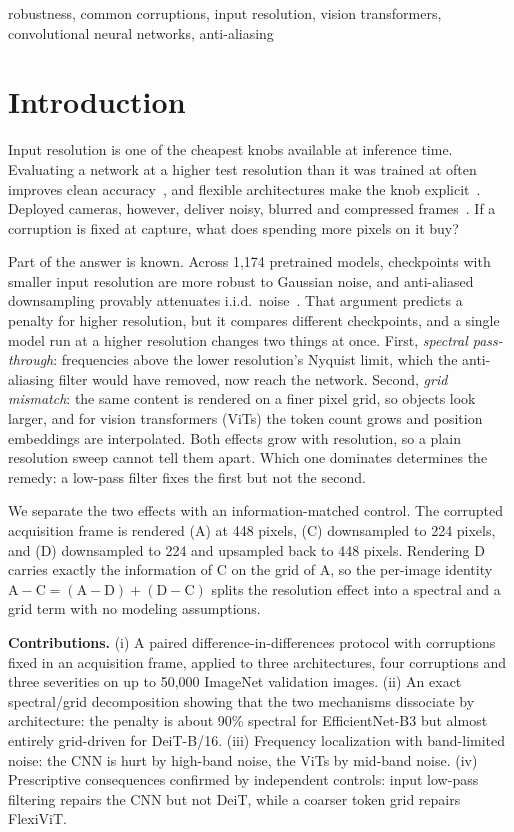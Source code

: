\documentclass[conference]{IEEEtran}
\begin{document}
\begin{IEEEkeywords}
robustness, common corruptions, input resolution, vision transformers, convolutional neural networks, anti-aliasing
\end{IEEEkeywords}

\section{Introduction}
Input resolution is one of the cheapest knobs available at inference time. Evaluating a network at a higher test resolution than it was trained at often improves clean accuracy~\cite{touvron2019fixres}, and flexible architectures make the knob explicit~\cite{beyer2023flexivit,tian2023resformer,dehghani2023navit}. Deployed cameras, however, deliver noisy, blurred and compressed frames~\cite{dodge2016quality,hendrycks2019benchmarking}. If a corruption is fixed at capture, what does spending more pixels on it buy?

Part of the answer is known. Across 1,174 pretrained models, checkpoints with smaller input resolution are more robust to Gaussian noise, and anti-aliased downsampling provably attenuates i.i.d.\ noise~\cite{kim2025noise}. That argument predicts a penalty for higher resolution, but it compares different checkpoints, and a single model run at a higher resolution changes two things at once. First, \emph{spectral pass-through}: frequencies above the lower resolution's Nyquist limit, which the anti-aliasing filter would have removed, now reach the network. Second, \emph{grid mismatch}: the same content is rendered on a finer pixel grid, so objects look larger, and for vision transformers (ViTs) the token count grows and position embeddings are interpolated. Both effects grow with resolution, so a plain resolution sweep cannot tell them apart. Which one dominates determines the remedy: a low-pass filter fixes the first but not the second.

We separate the two effects with an information-matched control. The corrupted acquisition frame is rendered (A) at 448 pixels, (C) downsampled to 224 pixels, and (D) downsampled to 224 and upsampled back to 448 pixels. Rendering D carries exactly the information of C on the grid of A, so the per-image identity $\mathrm{A}-\mathrm{C}=(\mathrm{A}-\mathrm{D})+(\mathrm{D}-\mathrm{C})$ splits the resolution effect into a spectral and a grid term with no modeling assumptions.

\textbf{Contributions.} (i) A paired difference-in-differences protocol with corruptions fixed in an acquisition frame, applied to three architectures, four corruptions and three severities on up to 50,000 ImageNet validation images. (ii) An exact spectral/grid decomposition showing that the two mechanisms dissociate by architecture: the penalty is about 90\% spectral for EfficientNet-B3 but almost entirely grid-driven for DeiT-B/16. (iii) Frequency localization with band-limited noise: the CNN is hurt by high-band noise, the ViTs by mid-band noise. (iv) Prescriptive consequences confirmed by independent controls: input low-pass filtering repairs the CNN but not DeiT, while a coarser token grid repairs FlexiViT.
\end{document}
